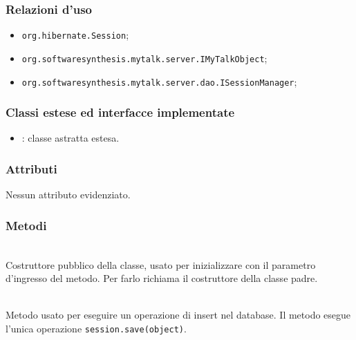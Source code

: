 \subsubsection*{Relazioni d'uso}

\begin{itemize}
		\item \texttt{org.hibernate.Session};
		\item \texttt{org.softwaresynthesis.mytalk.server.IMyTalkObject};
		\item \texttt{org.softwaresynthesis.mytalk.server.dao.ISessionManager};
\end{itemize}

\subsubsection*{Classi estese ed interfacce implementate}

\begin{itemize}
	\item {}: classe astratta estesa.
\end{itemize}

\subsubsection*{Attributi}

Nessun attributo evidenziato.

\subsubsection*{Metodi}

\begin{description}
	\item{}\\
	Costruttore pubblico della classe, usato per inizializzare  con il parametro d'ingresso del metodo. Per farlo richiama il costruttore della classe padre.

	\item{}\\
	Metodo usato per eseguire un operazione di insert nel database. Il metodo esegue l'unica operazione \verb|session.save(object)|.

\end{description}


